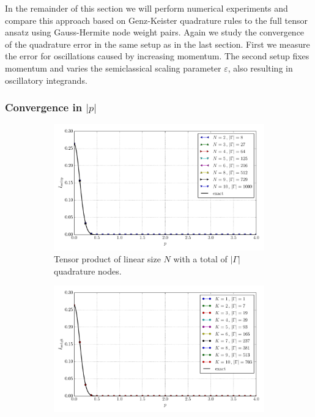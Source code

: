 \documentclass[a4paper,10pt]{article}
\begin{document}
In the remainder of this section we will perform numerical experiments and
compare this approach based on Genz-Keister quadrature rules to the full
tensor ansatz using Gauss-Hermite node weight pairs. Again we study the
convergence of the quadrature error in the same setup as in the last section.
First we measure the error for oscillations caused by increasing momentum.
The second setup fixes momentum and varies the semiclassical scaling
parameter $\varepsilon$, also resulting in oscillatory integrands.


\FloatBarrier
\subsubsection{Convergence in $|p|$}


\begin{figure}[ht!]
  \begin{subfigure}[t]{0.5\linewidth}
    \includegraphics[width=\linewidth]{./plots/tp_sg_3d_conv_p_(0,0,0)_(0,0,0)_val_nsd_tp.pdf}
    \caption{Tensor product of linear size $N$ with a total of $|\Gamma|$ quadrature nodes.}
    \label{fig:tp_sg_3d_conv_p_000_000_val_nsd_tp}
  \end{subfigure}
  \begin{subfigure}[t]{0.5\linewidth}
    \includegraphics[width=\linewidth]{./plots/tp_sg_3d_conv_p_(0,0,0)_(0,0,0)_val_nsd_gk.pdf}

\end{subfigure}
\end{figure}
\end{document}
